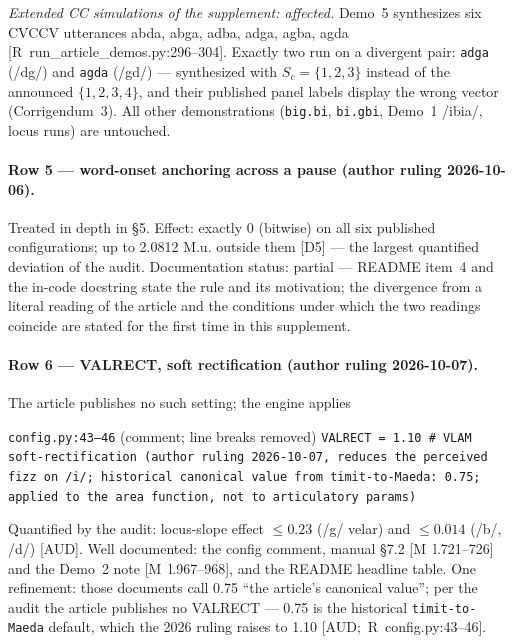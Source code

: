 \documentclass[11pt,letterpaper]{article}
\newcommand{\code}[1]{\texttt{#1}}
\newcommand{\Mua}{M.u.}
\begin{document}
\emph{Extended CC simulations of the supplement: affected.} Demo~5 synthesizes
six CVCCV utterances abda, abga, adba, adga, agba, agda
\hbox{[R run\_article\_demos.py:296--304]}. Exactly two run on a divergent
pair: \code{adga} (/dg/) and \code{agda} (/gd/) --- synthesized with
$S_c = \{1,2,3\}$ instead of the announced $\{1,2,3,4\}$, and their published
panel labels display the wrong vector (Corrigendum~3). All other
demonstrations (\code{big.bi}, \code{bi.gbi}, Demo~1 /ibia/, locus runs) are
untouched.

\paragraph{Row 5 --- word-onset anchoring across a pause
(author ruling 2026-10-06).}
Treated in depth in \S5. Effect: exactly 0 (bitwise) on all six published
configurations; up to 2.0812 \Mua{} outside them \hbox{[D5]} --- the largest
quantified deviation of the audit. Documentation status: partial --- README
item~4 and the in-code docstring state the rule and its motivation; the
divergence from a literal reading of the article and the conditions under
which the two readings coincide are stated for the first time in this
supplement.

\paragraph{Row 6 --- VALRECT, soft rectification (author ruling 2026-10-07).}
The article publishes no such setting; the engine applies
\begin{qbox}{\code{config.py:43--46} (comment; line breaks removed)}
\small
\code{VALRECT = 1.10 \# VLAM soft-rectification (author ruling 2026-10-07,
reduces the perceived fizz on /i/; historical canonical value from
timit-to-Maeda: 0.75; applied to the area function, not to articulatory
params)}
\end{qbox}
\noindent Quantified by the audit: locus-slope effect $\le 0.23$ (/g/ velar)
and $\le 0.014$ (/b/, /d/) \hbox{[AUD]}. Well documented: the config comment,
manual \S7.2 \hbox{[M l.721--726]} and the Demo~2 note \hbox{[M l.967--968]},
and the README headline table. One refinement: those documents call 0.75
``the article's canonical value''; per the audit the article publishes no
VALRECT --- 0.75 is the historical \code{timit-to-Maeda} default, which the
2026 ruling raises to 1.10 \hbox{[AUD; R config.py:43--46]}.
\end{document}
